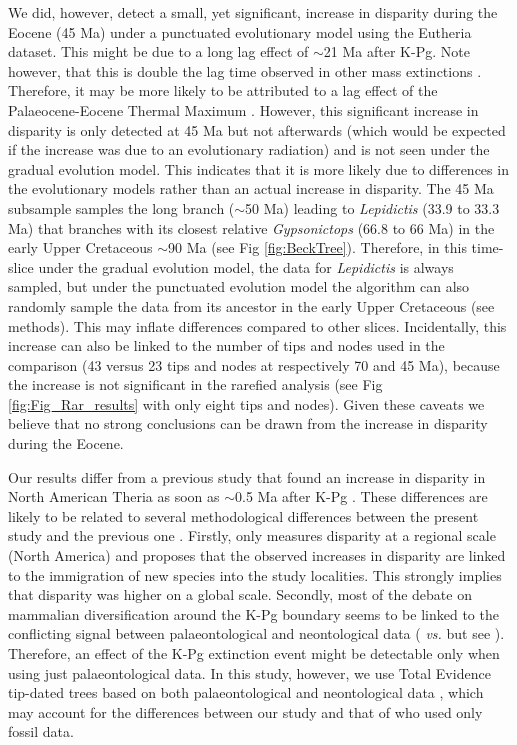 We did, however, detect a small, yet significant, increase in disparity during the Eocene (45 Ma) under a punctuated evolutionary model using the Eutheria dataset.
This might be due to a long lag effect of $\sim$21 Ma after K-Pg.
Note however, that this is double the lag time observed in other mass extinctions \citep{chen2012timing}.
Therefore, it may be more likely to be attributed to a lag effect of the Palaeocene-Eocene Thermal Maximum \citep[PETM; $\sim$11 Ma afterwards;][]{bininda-emondsthe2007}.
However, this significant increase in disparity is only detected at 45 Ma but not afterwards (which would be expected if the increase was due to an evolutionary radiation) and is not seen under the gradual evolution model.
This indicates that it is more likely due to differences in the evolutionary models rather than an actual increase in disparity.
The 45 Ma subsample samples the long branch ($\sim$50 Ma) leading to \textit{Lepidictis} (33.9 to 33.3 Ma) that branches with its closest relative \textit{Gypsonictops} (66.8 to 66 Ma) in the early Upper Cretaceous $\sim$90 Ma (see Fig \ref{fig:BeckTree}).
Therefore, in this time-slice under the gradual evolution model, the data for \textit{Lepidictis} is always sampled, but under the punctuated evolution model the algorithm can also randomly sample the data from its ancestor in the early Upper Cretaceous (see methods).
This may inflate differences compared to other slices.
Incidentally, this increase can also be linked to the number of tips and nodes used in the comparison (43 versus 23 tips and nodes at respectively 70 and 45 Ma), because the increase is not significant in the rarefied analysis (see Fig \ref{fig:Fig_Rar_results} with only eight tips and nodes).
Given these caveats we believe that no strong conclusions can be drawn from the increase in disparity during the Eocene.

Our results differ from a previous study that found an increase in disparity in North American Theria as soon as $\sim$0.5 Ma after K-Pg \citep{Wilson2013}.
These differences are likely to be related to several methodological differences between the present study and the previous one \citep{Wilson2013}.
Firstly, \cite{Wilson2013} only measures disparity at a regional scale (North America) and proposes that the observed increases in disparity are linked to the immigration of new species into the study localities.
This strongly implies that disparity was higher on a global scale.
Secondly, most of the debate on mammalian diversification around the K-Pg boundary seems to be linked to the conflicting signal between palaeontological and neontological data (\citealt{meredithimpacts2011} \textit{vs.} \citealt{O'Leary08022013} but see \citealt{dosReis2014}).
Therefore, an effect of the K-Pg extinction event might be detectable only when using just palaeontological data.
In this study, however, we use Total Evidence tip-dated trees based on both palaeontological and neontological data \citep{Slater2012MEE,beckancient2014}, which may account for the differences between our study and that of \cite{Wilson2013} who used only fossil data.

